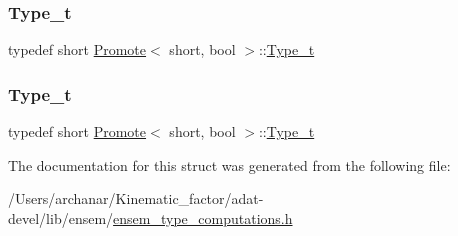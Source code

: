 \subsubsection{\texorpdfstring{Type\_t}{Type\_t}\hspace{0.1cm}{\footnotesize\ttfamily [2/3]}}
{\footnotesize\ttfamily typedef short \mbox{\hyperlink{structPromote}{Promote}}$<$ short, bool $>$\+::\mbox{\hyperlink{structPromote_3_01short_00_01bool_01_4_a4f4ef8db654939c693bf155cff1e36a3}{Type\+\_\+t}}}

\mbox{\label{structPromote_3_01short_00_01bool_01_4_a4f4ef8db654939c693bf155cff1e36a3}} 
\subsubsection{\texorpdfstring{Type\_t}{Type\_t}\hspace{0.1cm}{\footnotesize\ttfamily [3/3]}}
{\footnotesize\ttfamily typedef short \mbox{\hyperlink{structPromote}{Promote}}$<$ short, bool $>$\+::\mbox{\hyperlink{structPromote_3_01short_00_01bool_01_4_a4f4ef8db654939c693bf155cff1e36a3}{Type\+\_\+t}}}



The documentation for this struct was generated from the following file\+:\begin{DoxyCompactItemize}
\item 
/\+Users/archanar/\+Kinematic\+\_\+factor/adat-\/devel/lib/ensem/\mbox{\hyperlink{adat-devel_2lib_2ensem_2ensem__type__computations_8h}{ensem\+\_\+type\+\_\+computations.\+h}}\end{DoxyCompactItemize}
